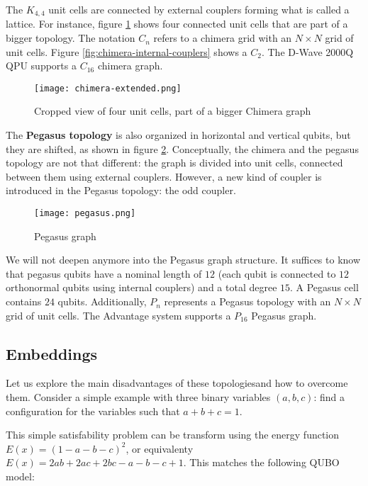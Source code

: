 The $K_{4,4}$ unit cells are connected by external couplers forming what is called a lattice. For instance, figure \ref{fig:chimera-extended} shows four connected unit cells that are part of a bigger topology. The notation $C_n$ refers to a chimera grid with an $N \times N$ grid of unit cells. Figure \ref{fig:chimera-internal-couplers} shows a $C_2$. The D-Wave 2000Q QPU supports a $C_16$ chimera graph.

\begin{figure}[h]
	\texttt{[image: chimera-extended.png]}
	\centering
	\caption{Cropped view of four unit cells, part of a bigger Chimera graph \cite{DWaveDoc-Architecture}}
	\label{fig:chimera-extended}
\end{figure}

The \textbf{Pegasus topology} is also organized in horizontal and vertical qubits, but they are shifted, as shown in figure \ref{fig:pegasus}. Conceptually, the chimera and the pegasus topology are not that different: the graph is divided into unit cells, connected between them using external couplers. However, a new kind of coupler is introduced in the Pegasus topology: the odd coupler.

\begin{figure}[h]
	\texttt{[image: pegasus.png]}
	\centering
	\caption{Pegasus graph \cite{DWaveDoc-Architecture}}
	\label{fig:pegasus}
\end{figure}

We will not deepen anymore into the Pegasus graph structure. It suffices to know that pegasus qubits have a nominal length of $12$ (each qubit is connected to $12$ orthonormal qubits using internal couplers) and a total degree $15$. A Pegasus cell contains $24$ qubits. Additionally, $P_n$ represents a Pegasus topology with an $N \times N$ grid of unit cells. The Advantage system supports a $P_{16}$ Pegasus graph.


\subsection{Embeddings}
\label{sec:embeddings}

Let us explore the main disadvantages of these topologiesand how to overcome them. Consider a simple example with three binary variables $(a, b, c)$: find a configuration for the variables such that $a + b + c = 1$.

This simple satisfability problem can be transform using the energy function $E(x) = (1 - a - b - c)^2$, or equivalenty $E(x) = 2ab + 2ac + 2bc - a - b - c + 1$. This matches the following QUBO model:

